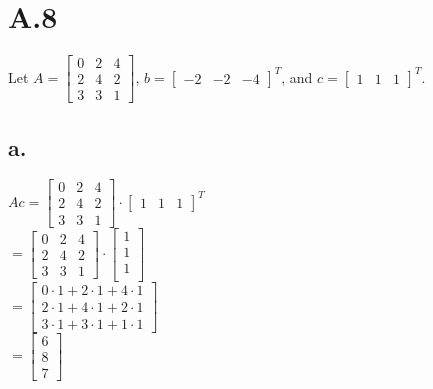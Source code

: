 \documentclass{article}
\newcommand{\1}{\mathbf{1}}
\begin{document}
\section*{A.8}
{\Large 

Let $A = \begin{bmatrix} 0 & 2 & 4 \\ 2 & 4 & 2 \\ 3 & 3 & 1 \end{bmatrix}$, $b = \begin{bmatrix} -2 & -2 & -4 \end{bmatrix}^T$, and $c=\begin{bmatrix} 1 & 1 & 1 \end{bmatrix}^T$.

\subsection*{a.}
$Ac = \begin{bmatrix} 0 & 2 & 4 \\ 2 & 4 & 2 \\ 3 & 3 & 1 \end{bmatrix} \cdot \begin{bmatrix} 1 & 1 & 1 \end{bmatrix}^T$ \\ 
$= \begin{bmatrix} 0 & 2 & 4 \\ 2 & 4 & 2 \\ 3 & 3 & 1 \end{bmatrix} \cdot \begin{bmatrix} 1 \\ 1 \\ 1 \\ \end{bmatrix}$ \\
$= \begin{bmatrix} 0 \cdot 1 + 2 \cdot 1 + 4 \cdot 1 \\ 2 \cdot 1 + 4 \cdot 1 + 2 \cdot 1 \\ 3 \cdot 1 + 3 \cdot 1 + 1 \cdot 1 \end{bmatrix}$ \\
$= \begin{bmatrix} 6 \\ 8 \\ 7 \end{bmatrix}$

}
\end{document}
